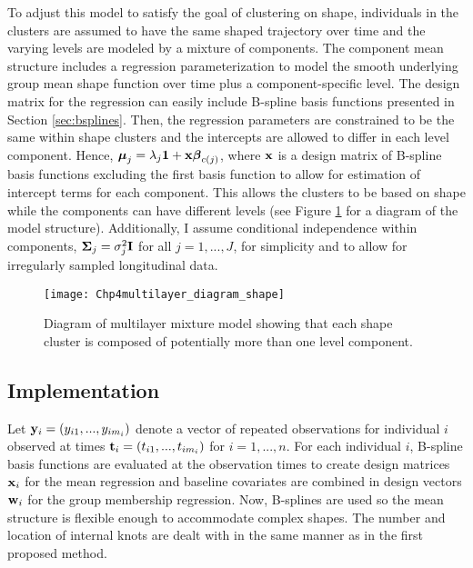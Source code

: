 To adjust this model to satisfy the goal of clustering on shape, individuals in the clusters are assumed to have the same shaped trajectory over time and the varying levels are modeled by a mixture of components. The component mean structure includes a regression parameterization to model the smooth underlying group mean shape function over time plus a component-specific level. The design matrix for the regression can easily include B-spline basis functions presented in Section \ref{sec:bsplines}. Then, the regression parameters are constrained to be the same within shape clusters and the intercepts are allowed to differ in each level component. Hence, $\boldsymbol\mu_{j}=\lambda_{j}\mathbf 1+\mathbf x \boldsymbol\beta_{c(j)}$, where $\mathbf x$ is a design matrix of B-spline basis functions excluding the first basis function to allow for estimation of intercept terms for each component. This allows the clusters to be based on shape while the components can have different levels (see Figure \ref{fig:diashape} for a diagram of the model structure). Additionally, I assume conditional independence within components, $\boldsymbol\Sigma_{j}=\sigma^{2}_{j}\mathbf I$ for all $j=1,...,J$,  for simplicity and to allow for irregularly sampled longitudinal data.
\begin{figure}[h]
\centering
\texttt{[image: Chp4multilayer\_diagram\_shape]}
\caption{Diagram of multilayer mixture model showing that each shape cluster is composed of potentially more than one level component.}
\label{fig:diashape}
\end{figure}

\subsection{Implementation}
Let $\mathbf y_{i}=(y_{i1},...,y_{im_{i}})$ denote a vector of repeated observations for individual $i$ observed at times $\mathbf t_{i}=(t_{i1},...,t_{im_{i}})$  for $i=1,...,n$. For each individual $i$, B-spline basis functions are evaluated at the observation times to create design matrices $\mathbf x_{i}$ for the mean regression and baseline covariates are combined in design vectors $\mathbf w_{i}$ for the group membership regression. Now, B-splines are used so the mean structure is flexible enough to accommodate complex shapes. The number and location of internal knots are dealt with in the same manner as in the first proposed method.

